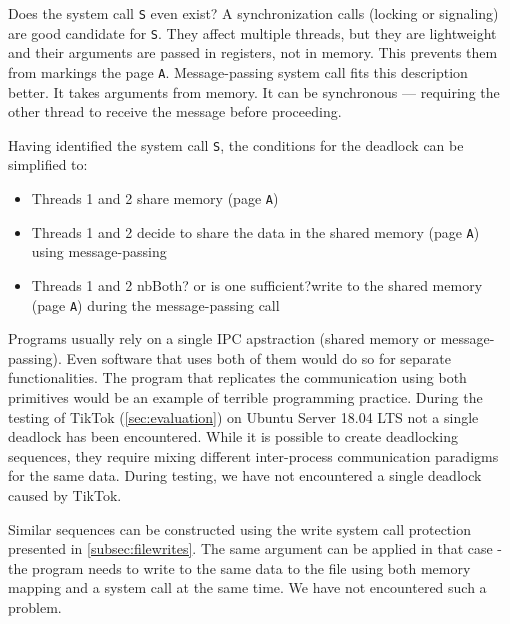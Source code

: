 Does the system call \texttt{S} even exist? A synchronization calls (locking or
signaling) are good candidate for \texttt{S}. They affect multiple threads, but
they are lightweight and their arguments are passed in registers, not in memory.
This prevents them from markings the page \texttt{A}. Message-passing system call
fits this description better. It takes arguments from memory. It can be
synchronous --- requiring the other thread to receive the message before
proceeding.

Having identified the system call \texttt{S}, the conditions for the deadlock
can be simplified to:

\begin{itemize}
  \item Threads 1 and 2 share memory (page \texttt{A})
  \item Threads 1 and 2 decide to share the data in the shared memory (page
        \texttt{A}) using message-passing
      \item Threads 1 and 2 nb{Both? or is one sufficient?}write to the shared memory (page \texttt{A}) during the
        message-passing call                       
\end{itemize}

Programs usually rely on a single IPC apstraction (shared memory or
message-passing). Even software that uses both of them would do so for separate
functionalities. The program that replicates the communication using both
primitives would be an example of terrible programming practice. During the
testing of TikTok (\cref{sec:evaluation}) on Ubuntu Server 18.04 LTS not a
single deadlock has been encountered. While it is possible to create deadlocking
sequences, they require mixing different inter-process communication paradigms
for the same data. During testing, we have not encountered a single deadlock
caused by TikTok.

Similar sequences can be constructed using the write system call protection
presented in \cref{subsec:filewrites}. The same argument can be applied in that
case - the program needs to write to the same data to the file using both memory
mapping and a system call at the same time. We have not encountered such a
problem.


